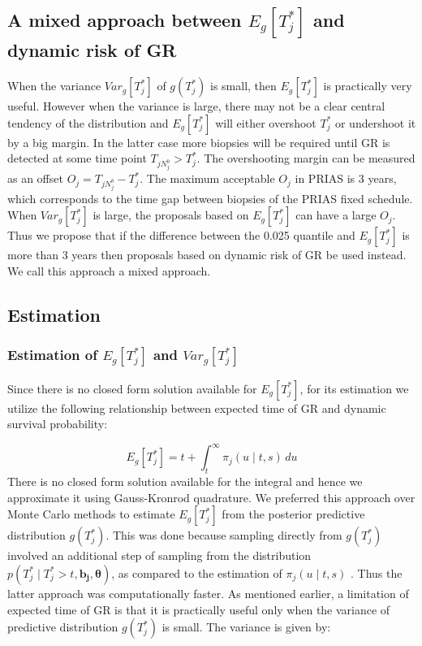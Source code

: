 \subsection{A mixed approach between $E_g[T^*_j]$ and dynamic risk of GR}
\label{subsec : mixed_approach}
When the variance $Var_g[T^*_j]$ of $g(T^*_j)$ is small, then $E_g[T^*_j]$ is practically very useful. However when the variance is large, there may not be a clear central tendency of the distribution and $E_g[T^*_j]$ will either overshoot $T^*_j$ or undershoot it by a big margin. In the latter case more biopsies will be required until GR is detected at some time point $T_{j{N_j^b}} >  T^*_j$. The overshooting margin can be measured as an offset $O_j = T_{j{N_j^b}} - T_j^*$. The maximum acceptable $O_j$ in PRIAS is 3 years, which corresponds to the time gap between biopsies of the PRIAS fixed schedule. When $Var_g[T^*_j]$ is large, the proposals based on $E_g[T^*_j]$ can have a large $O_j$. Thus we propose that if the difference between the 0.025 quantile and $E_g[T^*_j]$ is more than 3 years then proposals based on dynamic risk of GR be used instead. We call this approach a mixed approach.

\subsection{Estimation}
\subsubsection{Estimation of $E_g[T^*_j]$ and $Var_g[T^*_j]$}
Since there is no closed form solution available for $E_g[T^*_j]$, for its estimation we utilize the following relationship between expected time of GR and dynamic survival probability:

\begin{equation*}
E_g[T^*_j] = t + \int_t^\infty \pi_j(u \mid t, s) \,du
\end{equation*}
There is no closed form solution available for the integral and hence we approximate it using Gauss-Kronrod quadrature. We preferred this approach over Monte Carlo methods to estimate $E_g[T^*_j]$ from the posterior predictive distribution $g(T^*_j)$. This was done because sampling directly from $g(T^*_j)$ involved an additional step of sampling from the distribution $p(T^*_j \mid T^*_j > t, \boldsymbol{b_j}, \boldsymbol{\theta})$, as compared to the estimation of $\pi_j(u \mid t, s)$ \citep{rizopoulos2011dynamic}. Thus the latter approach was computationally faster. As mentioned earlier, a limitation of expected time of GR is that it is practically useful only when the variance of predictive distribution $g(T^*_j)$ is small. The variance is given by:

